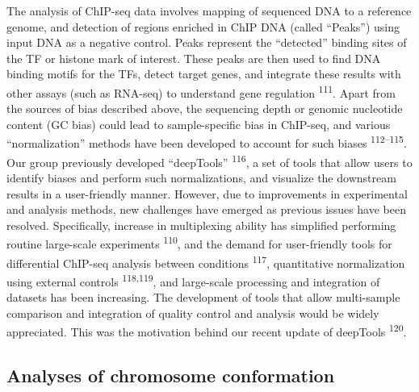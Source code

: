 \documentclass[11pt,twoside]{MPIthesis}
\theoremstyle{definition}
\theoremstyle{definition}
\theoremstyle{definition}
\theoremstyle{remark}
\begin{document}
The analysis of ChIP-seq data involves mapping of sequenced DNA to a
reference genome, and detection of regions enriched in ChIP DNA (called
``Peaks'') using input DNA as a negative control. Peaks represent the
``detected'' binding sites of the TF or histone mark of interest. These
peaks are then used to find DNA binding motifs for the TFs, detect
target genes, and integrate these results with other assays (such as
RNA-seq) to understand gene regulation \textsuperscript{111}. Apart from
the sources of bias described above, the sequencing depth or genomic
nucleotide content (GC bias) could lead to sample-specific bias in
ChIP-seq, and various ``normalization'' methods have been developed to
account for such biases \textsuperscript{112--115}. Our group previously
developed ``deepTools'' \textsuperscript{116}, a set of tools that allow
users to identify biases and perform such normalizations, and visualize
the downstream results in a user-friendly manner. However, due to
improvements in experimental and analysis methods, new challenges have
emerged as previous issues have been resolved. Specifically, increase in
multiplexing ability has simplified performing routine large-scale
experiments \textsuperscript{110}, and the demand for user-friendly
tools for differential ChIP-seq analysis between conditions
\textsuperscript{117}, quantitative normalization using external
controls \textsuperscript{118,119}, and large-scale processing and
integration of datasets has been increasing. The development of tools
that allow multi-sample comparison and integration of quality control
and analysis would be widely appreciated. This was the motivation behind
our recent update of deepTools \textsuperscript{120}.

\subsection{Analyses of chromosome
conformation}\label{analyses-of-chromosome-conformation}
\end{document}
